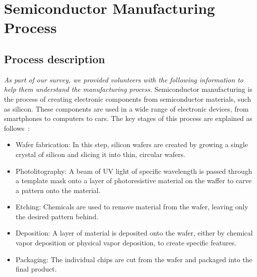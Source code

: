 

\section{Semiconductor Manufacturing Process}
\label{appendix:semiconductorInfo}

\subsection{{Process description}}
\label{appendix:semiconductorProcessDesc}
\textit{As part of our survey, we provided volunteers with the following information to help them understand the manufacturing process.}
Semiconductor manufacturing is the process of creating electronic components from semiconductor materials, such as silicon. These components are used in a wide range of electronic devices, from smartphones to computers to cars. The key stages of this process are explained as follows~\cite{kamal2022}:

\begin{itemize}
    \item Wafer fabrication: In this step, silicon wafers are created by growing a single crystal of silicon and slicing it into thin, circular wafers.
    \item Photolitography: A beam of UV light of specific wavelength is passed through a template mask onto a layer of photoresistive material on the waffer to carve a pattern onto the material.
    \item Etching: Chemicals are used to remove material from the wafer, leaving only the desired pattern behind.
    \item Deposition: A layer of material is deposited onto the wafer, either by chemical vapor deposition or physical vapor deposition, to create specific features.
    \item Packaging: The individual chips are cut from the wafer and packaged into the final product.
\end{itemize}



